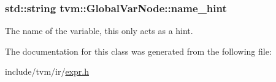 \subsubsection[{\texorpdfstring{name\+\_\+hint}{name_hint}}]{\setlength{\rightskip}{0pt plus 5cm}std\+::string tvm\+::\+Global\+Var\+Node\+::name\+\_\+hint}\hypertarget{classtvm_1_1GlobalVarNode_a0db816494d9c003bea73bcc23b7ba0de}{}\label{classtvm_1_1GlobalVarNode_a0db816494d9c003bea73bcc23b7ba0de}


The name of the variable, this only acts as a hint. 



The documentation for this class was generated from the following file\+:\begin{DoxyCompactItemize}
\item 
include/tvm/ir/\hyperlink{ir_2expr_8h}{expr.\+h}\end{DoxyCompactItemize}

